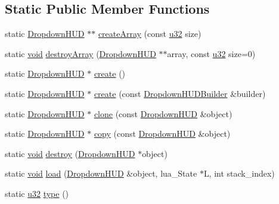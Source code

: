 \subsection*{Static Public Member Functions}
\begin{DoxyCompactItemize}
\item 
static \mbox{\hyperlink{classnjli_1_1_dropdown_h_u_d}{Dropdown\+H\+UD}} $\ast$$\ast$ \mbox{\hyperlink{classnjli_1_1_dropdown_h_u_d_a095aa2d4f9246574b3c23f88a13dfb1c}{create\+Array}} (const \mbox{\hyperlink{_util_8h_a10e94b422ef0c20dcdec20d31a1f5049}{u32}} size)
\item 
static \mbox{\hyperlink{_thread_8h_af1e856da2e658414cb2456cb6f7ebc66}{void}} \mbox{\hyperlink{classnjli_1_1_dropdown_h_u_d_ad05de3f92cb4b4416336bef15656f50e}{destroy\+Array}} (\mbox{\hyperlink{classnjli_1_1_dropdown_h_u_d}{Dropdown\+H\+UD}} $\ast$$\ast$array, const \mbox{\hyperlink{_util_8h_a10e94b422ef0c20dcdec20d31a1f5049}{u32}} size=0)
\item 
static \mbox{\hyperlink{classnjli_1_1_dropdown_h_u_d}{Dropdown\+H\+UD}} $\ast$ \mbox{\hyperlink{classnjli_1_1_dropdown_h_u_d_a00af5f57aaf031925d0c5713fa333a6d}{create}} ()
\item 
static \mbox{\hyperlink{classnjli_1_1_dropdown_h_u_d}{Dropdown\+H\+UD}} $\ast$ \mbox{\hyperlink{classnjli_1_1_dropdown_h_u_d_a71e72935db6a1fe32732bb3bb9e6f08f}{create}} (const \mbox{\hyperlink{classnjli_1_1_dropdown_h_u_d_builder}{Dropdown\+H\+U\+D\+Builder}} \&builder)
\item 
static \mbox{\hyperlink{classnjli_1_1_dropdown_h_u_d}{Dropdown\+H\+UD}} $\ast$ \mbox{\hyperlink{classnjli_1_1_dropdown_h_u_d_a3647fb8d0fb638143422fdb09a1dc28a}{clone}} (const \mbox{\hyperlink{classnjli_1_1_dropdown_h_u_d}{Dropdown\+H\+UD}} \&object)
\item 
static \mbox{\hyperlink{classnjli_1_1_dropdown_h_u_d}{Dropdown\+H\+UD}} $\ast$ \mbox{\hyperlink{classnjli_1_1_dropdown_h_u_d_a14eb934a222d965720b1e6136e811f6f}{copy}} (const \mbox{\hyperlink{classnjli_1_1_dropdown_h_u_d}{Dropdown\+H\+UD}} \&object)
\item 
static \mbox{\hyperlink{_thread_8h_af1e856da2e658414cb2456cb6f7ebc66}{void}} \mbox{\hyperlink{classnjli_1_1_dropdown_h_u_d_a0e7fb8e32c9502d53097d087c6ca8d72}{destroy}} (\mbox{\hyperlink{classnjli_1_1_dropdown_h_u_d}{Dropdown\+H\+UD}} $\ast$object)
\item 
static \mbox{\hyperlink{_thread_8h_af1e856da2e658414cb2456cb6f7ebc66}{void}} \mbox{\hyperlink{classnjli_1_1_dropdown_h_u_d_aed5178a3f55b8db4ffd0349edc7e73cf}{load}} (\mbox{\hyperlink{classnjli_1_1_dropdown_h_u_d}{Dropdown\+H\+UD}} \&object, lua\+\_\+\+State $\ast$L, int stack\+\_\+index)
\item 
static \mbox{\hyperlink{_util_8h_a10e94b422ef0c20dcdec20d31a1f5049}{u32}} \mbox{\hyperlink{classnjli_1_1_dropdown_h_u_d_a16c5e70d8b3d9e0f28591c6e82c83483}{type}} ()
\end{DoxyCompactItemize}
